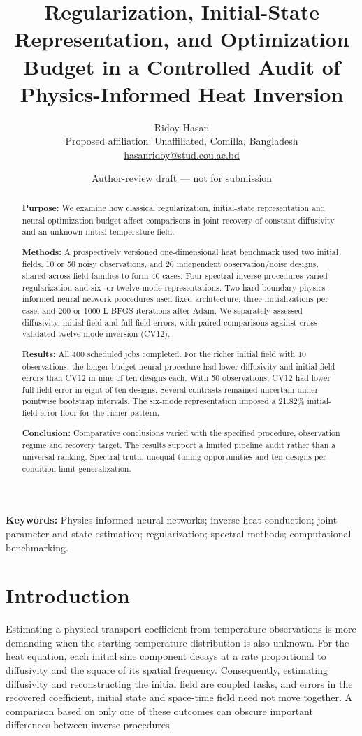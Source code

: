 \documentclass[10pt,a4paper]{article}
\title{Regularization, Initial-State Representation, and Optimization Budget in a Controlled Audit of Physics-Informed Heat Inversion}
\author{Ridoy Hasan\\Proposed affiliation: Unaffiliated, Comilla, Bangladesh\\
\href{mailto:hasanridoy@stud.cou.ac.bd}{hasanridoy@stud.cou.ac.bd}}
\date{Author-review draft --- not for submission}
\begin{document}
\maketitle
\begin{abstract}
\textbf{Purpose:} We examine how classical regularization, initial-state representation
and neural optimization budget affect comparisons in joint recovery of constant
diffusivity and an unknown initial temperature field.

\textbf{Methods:} A prospectively versioned one-dimensional heat benchmark used two
initial fields, 10 or 50 noisy observations, and 20 independent observation/noise
designs, shared across field families to form 40 cases. Four spectral inverse
procedures varied regularization and six- or twelve-mode representations. Two
hard-boundary physics-informed neural network procedures used fixed architecture,
three initializations per case, and 200 or 1000 L-BFGS iterations after Adam.
We separately assessed diffusivity, initial-field and full-field errors, with
paired comparisons against cross-validated twelve-mode inversion (CV12).

\textbf{Results:} All 400 scheduled jobs completed. For the richer initial field with
10 observations, the longer-budget neural procedure had lower diffusivity and
initial-field errors than CV12 in nine of ten designs each. With 50 observations,
CV12 had lower full-field error in eight of ten designs. Several contrasts
remained uncertain under pointwise bootstrap intervals. The six-mode
representation imposed a 21.82\% initial-field error floor for the richer pattern.

\textbf{Conclusion:} Comparative conclusions varied with the specified procedure,
observation regime and recovery target. The results support a limited pipeline
audit rather than a universal ranking. Spectral truth, unequal tuning opportunities
and ten designs per condition limit generalization.
\end{abstract}
\noindent\textbf{Keywords:} Physics-informed neural networks; inverse heat conduction; joint parameter and state estimation; regularization; spectral methods; computational benchmarking.

\section{Introduction}

Estimating a physical transport coefficient from temperature observations is
more demanding when the starting temperature distribution is also unknown.
For the heat equation, each initial sine component decays at a rate proportional
to diffusivity and the square of its spatial frequency. Consequently, estimating
diffusivity and reconstructing the initial field are coupled tasks, and errors
in the recovered coefficient, initial state and space-time field need not move
together. A comparison based on only one of these outcomes can obscure important
differences between inverse procedures.
\end{document}
